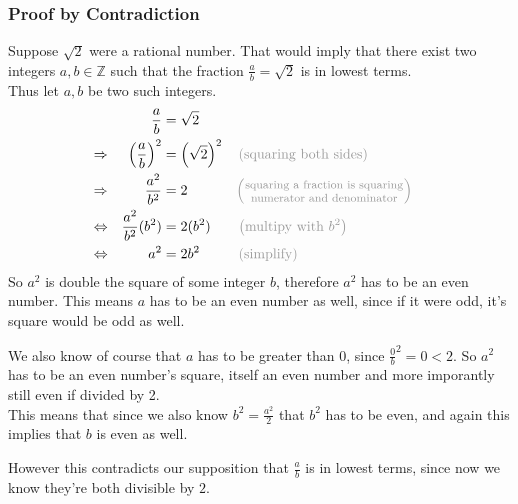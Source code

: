 \documentclass{article}
\newcommand{\mexpl}[1]{\color{gray_custom}\left(\text{#1}\right)}
\newcommand{\mexplbig}[1]{ \color{gray_custom}{\left(\parbox{4cm}{
                            \centering \footnotesize #1 }\right)} }
\begin{document}
    \subsubsection*{Proof by Contradiction}
    Suppose $\sqrt{2}$ were a rational number. 
    That would imply that there exist two integers $a,b\in\mathbb{Z}$ such that
    the fraction $\frac{a}{b} = \sqrt{2}$ is in lowest terms. \\
    Thus let $a,b$ be two such integers. 
    \begin{align*}
        &&       
            \frac{a}{b}                     &=          \sqrt{2}
                                                                                        \\
        \Rightarrow&&       
            \left(\frac{a}{b}\right)^2      &=          \left(\sqrt{2}\right)^2
            &&\mexpl{squaring both sides}
                                                                                        \\
        \Rightarrow&&       
            \frac{a^2}{b^2}                 &=          2
            &&\mexplbig{
                squaring a fraction is squaring numerator and denominator
            }
                                                                                        \\
        \Leftrightarrow&&       
            \frac{a^2}{b^2}(b^2)            &=          2(b^2)
            &&\mexpl{multipy with $b^2$}
                                                                                        \\
        \Leftrightarrow&&       
            a^2                             &=          2b^2
            &&\mexpl{simplify}
    \end{align*}
    So $a^2$ is double the square of some integer $b$, therefore $a^2$ has to
    be an even number. 
    This means $a$ has to be an even number as well, since if it were odd, it's
    square would be odd as well.

    We also know of course that $a$ has to be greater than $0$, since
    $\frac{0}{b}^2 = 0 < 2$. 
    So $a^2$ has to be an even number's square, itself an even number and more
    imporantly still even if divided by 2. \\
    This means that since we also know $b^2 = \frac{a^2}{2}$ that $b^2$ has to
    be even, and again this implies that $b$ is even as well. 

    However this contradicts our supposition that $\frac{a}{b}$ is in lowest
    terms, since now we know they're both divisible by $2$. 
\end{document}
